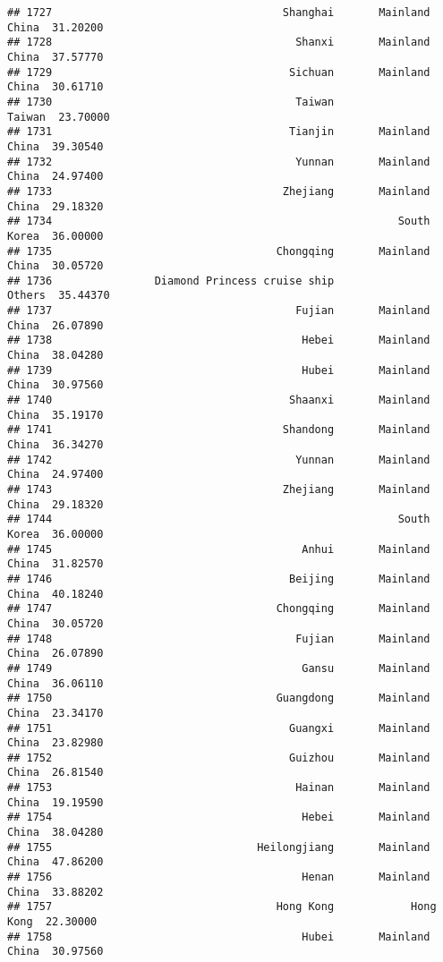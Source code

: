 \documentclass[
]{article}
\begin{document}
\begin{verbatim}
## 1727                                    Shanghai       Mainland China  31.20200
## 1728                                      Shanxi       Mainland China  37.57770
## 1729                                     Sichuan       Mainland China  30.61710
## 1730                                      Taiwan               Taiwan  23.70000
## 1731                                     Tianjin       Mainland China  39.30540
## 1732                                      Yunnan       Mainland China  24.97400
## 1733                                    Zhejiang       Mainland China  29.18320
## 1734                                                      South Korea  36.00000
## 1735                                   Chongqing       Mainland China  30.05720
## 1736                Diamond Princess cruise ship               Others  35.44370
## 1737                                      Fujian       Mainland China  26.07890
## 1738                                       Hebei       Mainland China  38.04280
## 1739                                       Hubei       Mainland China  30.97560
## 1740                                     Shaanxi       Mainland China  35.19170
## 1741                                    Shandong       Mainland China  36.34270
## 1742                                      Yunnan       Mainland China  24.97400
## 1743                                    Zhejiang       Mainland China  29.18320
## 1744                                                      South Korea  36.00000
## 1745                                       Anhui       Mainland China  31.82570
## 1746                                     Beijing       Mainland China  40.18240
## 1747                                   Chongqing       Mainland China  30.05720
## 1748                                      Fujian       Mainland China  26.07890
## 1749                                       Gansu       Mainland China  36.06110
## 1750                                   Guangdong       Mainland China  23.34170
## 1751                                     Guangxi       Mainland China  23.82980
## 1752                                     Guizhou       Mainland China  26.81540
## 1753                                      Hainan       Mainland China  19.19590
## 1754                                       Hebei       Mainland China  38.04280
## 1755                                Heilongjiang       Mainland China  47.86200
## 1756                                       Henan       Mainland China  33.88202
## 1757                                   Hong Kong            Hong Kong  22.30000
## 1758                                       Hubei       Mainland China  30.97560

\end{verbatim}
\end{document}
